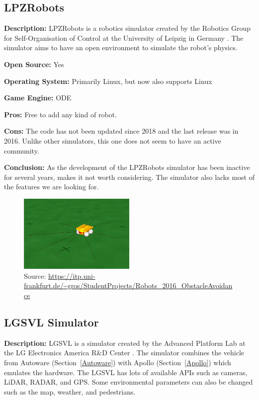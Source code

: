 \subsection{LPZRobots}
\textbf{Description:} LPZRobots is a robotics simulator created by the Robotics Group for Self-Organisation of Control at the University of Leipzig in Germany \cite{LPZRobots_Website, LPZRobots_book}. The simulator aims to have an open environment to simulate the robot's physics. 

\textbf{Open Source:} Yes

\textbf{Operating System:} Primarily Linux, but now also supports Linux

\textbf{Game Engine:} ODE

\textbf{Pros:} Free to add any kind of robot.

\textbf{Cons:} The code has not been updated since 2018 and the last release was in 2016. Unlike other simulators, this one does not seem to have an active community. 

\textbf{Conclusion:} As the development of the LPZRobots simulator has been inactive for several years, makes it not worth considering. The simulator also lacks most of the features we are looking for. 

\begin{figure}[H]
    \centering
    \includegraphics[width=0.5\textwidth]{Simulators/LPZRobots.png}
    \caption{Source: \url{https://itp.uni-frankfurt.de/~gros/StudentProjects/Robots\_2016\_ObstacleAvoidance}}
\end{figure}


\subsection{LGSVL Simulator} \label{LGSVL_Simulator}
\textbf{Description:} LGSVL is a simulator created by the Advanced Platform Lab at the LG Electronics America R\&D Center \cite{LGSVL_Web}. The simulator combines the vehicle from Autoware (Section~\ref{Autoware}) with Apollo (Section~\ref{Apollo}) which emulates the hardware. The LGSVL has lots of available APIs such as cameras, LiDAR, RADAR, and GPS. Some environmental parameters can also be changed such as the map, weather, and pedestrians.

